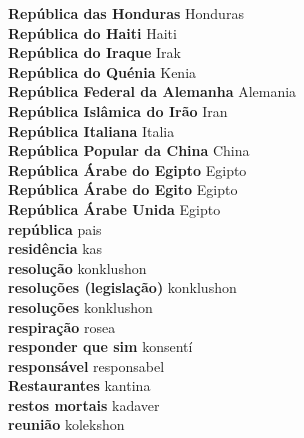 \textbf{ República das Honduras  } Honduras \\
\textbf{ República do Haiti  } Haiti \\
\textbf{ República do Iraque  } Irak \\
\textbf{ República do Quénia  } Kenia \\
\textbf{ República Federal da Alemanha  } Alemania \\
\textbf{ República Islâmica do Irão  } Iran \\
\textbf{ República Italiana  } Italia \\
\textbf{ República Popular da China  } China \\
\textbf{ República Árabe do Egipto  } Egipto \\
\textbf{ República Árabe do Egito  } Egipto \\
\textbf{ República Árabe Unida  } Egipto \\
\textbf{ república  } pais \\
\textbf{ residência  } kas \\
\textbf{ resolução  } konklushon \\
\textbf{ resoluções (legislação)  } konklushon \\
\textbf{ resoluções  } konklushon \\
\textbf{ respiração  } rosea \\
\textbf{ responder que sim  } konsentí \\
\textbf{ responsável  } responsabel \\
\textbf{ Restaurantes  } kantina \\
\textbf{ restos mortais  } kadaver \\
\textbf{ reunião  } kolekshon \\
